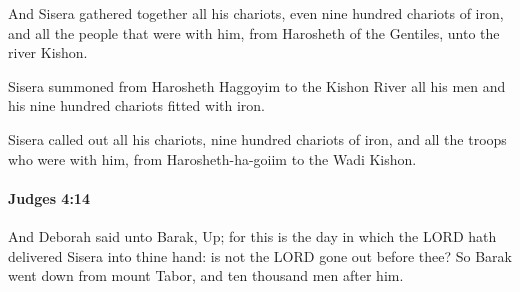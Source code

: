 			\begin{versebox}
					\item[BHS] 
					\item[ASV] And Sisera gathered together all his chariots, even nine hundred chariots of iron, and all the people that were with him, from Harosheth of the Gentiles, unto the river Kishon.
					\item[NIV] Sisera summoned from Harosheth Haggoyim to the Kishon River all his men and his nine hundred chariots fitted with iron.
					\item[NRSV] Sisera called out all his chariots, nine hundred chariots of iron, and all the troops who were with him, from Harosheth-ha-goiim to the Wadi Kishon.
			\end{versebox}

		\paragraph{Judges 4:14} %
			\label{JUDGES-4-14}

			And Deborah said unto Barak, Up; for this is the day in which the LORD hath delivered Sisera into thine hand: is not the LORD gone out before thee? So Barak went down from mount Tabor, and ten thousand men after him.

